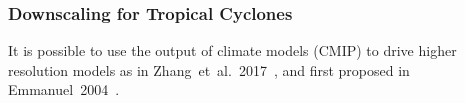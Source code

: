 \subsubsection{Downscaling for Tropical Cyclones}

It is possible to use the output of climate models (CMIP)
to drive higher resolution models as in
Zhang~et~al.~2017~\cite{zhang2017response},
and first proposed in
Emmanuel~2004~\cite{emanuel2008hurricanes}.
